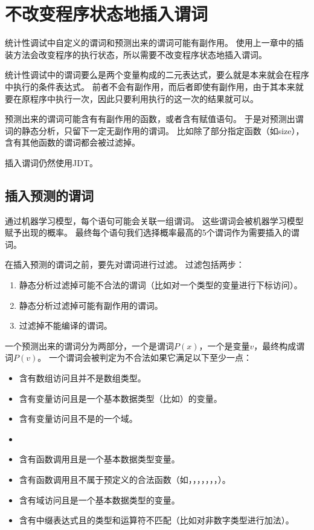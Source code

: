 \section{不改变程序状态地插入谓词}

统计性调试中自定义的谓词和预测出来的谓词可能有副作用。
使用上一章中的插装方法会改变程序的执行状态，所以需要不改变程序状态地插入谓词。

统计性调试中的谓词要么是两个变量构成的二元表达式，要么就是本来就会在程序中执行的条件表达式。
前者不会有副作用，而后者即使有副作用，由于其本来就要在原程序中执行一次，因此只要利用执行的这一次的结果就可以。

预测出来的谓词可能含有有副作用的函数，或者含有赋值语句。
于是对预测出谓词的静态分析，只留下一定无副作用的谓词。
比如除了部分指定函数（如size），含有其他函数的谓词都会被过滤掉。

插入谓词仍然使用JDT。

\subsection{插入预测的谓词}

通过机器学习模型，每个语句可能会关联一组谓词。
这些谓词会被机器学习模型赋予出现的概率。
最终每个语句我们选择概率最高的5个谓词作为需要插入的谓词。

在插入预测的谓词之前，要先对谓词进行过滤。
过滤包括两步：
\begin{enumerate}
\item 静态分析过滤掉可能不合法的谓词（比如对一个类型的变量进行下标访问）。
\item 静态分析过滤掉可能有副作用的谓词。
\item 过滤掉不能编译的谓词。
\end{enumerate}

一个预测出来的谓词分为两部分，一个是谓词$P(x)$，一个是变量$v$，最终构成谓词$P(v)$。
一个谓词会被判定为不合法如果它满足以下至少一点：
\begin{itemize}
\item 含有数组访问且并不是数组类型。
\item 含有变量访问且是一个基本数据类型（比如）的变量。
\item 含有变量访问且不是的一个域。
\item {}
\item 含有函数调用且是一个基本数据类型变量。
\item 含有函数调用且不属于预定义的合法函数（如，，，，，，，）。
\item 含有域访问且是一个基本数据类型的变量。
\item 含有中缀表达式且的类型和运算符不匹配（比如对非数字类型进行加法）。
\end{itemize}

